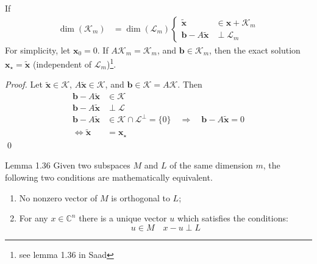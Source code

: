 If
\begin{align*}
    \dim(\mathcal{K}_m) & = \dim(\mathcal{L}_m)
    \begin{cases}
        \tilde{\mathbf{x}}               & \in \mathbf{x} + \mathcal{K}_m \\
        \mathbf{b} - A\tilde{\mathbf{x}} & \perp \mathcal{L}_m
    \end{cases}
\end{align*}
For simplicity, let $\mathbf{x}_0 = 0$.
If $A\mathcal{K}_m = \mathcal{K}_m$, and $\mathbf{b} \in \mathcal{K}_m$, then the exact solution $\mathbf{x}_\star = \tilde{\mathbf{x}}$ (independent of $\mathcal{L}_m$)\footnote{see lemma 1.36 in Saad}.
\begin{proof}
    Let $\tilde{\mathbf{x}} \in \mathcal{K}$, $A\tilde{\mathbf{x}} \in \mathcal{K}$, and $\mathbf{b} \in \mathcal{K} = A\mathcal{K}$.
    Then
    \begin{align*}
        \mathbf{b} - A\tilde{\mathbf{x}}   & \in \mathcal{K}                                                                                             \\
        \mathbf{b} - A\tilde{\mathbf{x}}   & \perp \mathcal{L}                                                                                           \\
        \mathbf{b} - A\tilde{\mathbf{x}}   & \in \mathcal{K} \cap \mathcal{L}^\perp = \{0\} \quad \Rightarrow \quad \mathbf{b} - A\tilde{\mathbf{x}} = 0 \\
        \Leftrightarrow \tilde{\mathbf{x}} & = \mathbf{x}_\star
    \end{align*}
    \qed
\end{proof}

\begin{lemma}{Lemma 1.36}{}
    Given two subspaces $M$ and $L$ of the same dimension $m$, the following two conditions are mathematically equivalent.

    \begin{enumerate}
        \item No nonzero vector of $M$ is orthogonal to $L$;
        \item For any $x \in \mathbb{C}^n$ there is a unique vector $u$ which satisfies the conditions:
              \begin{equation}
                  u     \in M \quad  x - u  \perp L
              \end{equation}
    \end{enumerate}
\end{lemma}

